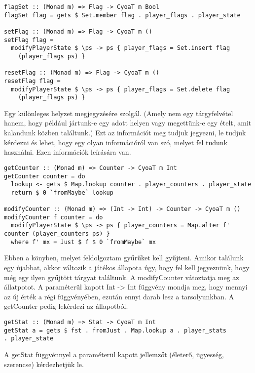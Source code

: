 \documentclass[12pt,a4paper,oneside]{report}
\begin{document}
    \begin{verbatim}
flagSet :: (Monad m) => Flag -> CyoaT m Bool
flagSet flag = gets $ Set.member flag . player_flags . player_state

setFlag :: (Monad m) => Flag -> CyoaT m ()
setFlag flag =
  modifyPlayerState $ \ps -> ps { player_flags = Set.insert flag
    (player_flags ps) }

resetFlag :: (Monad m) => Flag -> CyoaT m ()
resetFlag flag =
  modifyPlayerState $ \ps -> ps { player_flags = Set.delete flag
    (player_flags ps) }
    \end{verbatim}
    Egy különleges helyzet megjegyzésére szolgál. (Amely nem egy
    tárgyfelvétel hanem, hogy például jártunk-e egy adott helyen vagy
    megettünk-e egy ételt, amit kalandunk közben találtunk.) Ezt az
    információt meg tudjuk jegyezni, le tudjuk kérdezni és lehet, hogy
    egy olyan információról van szó, melyet fel tudunk használni. Ezen
    információk leírására van.

    \begin{verbatim}
getCounter :: (Monad m) => Counter -> CyoaT m Int
getCounter counter = do
  lookup <- gets $ Map.lookup counter . player_counters . player_state
  return $ 0 `fromMaybe` lookup

modifyCounter :: (Monad m) => (Int -> Int) -> Counter -> CyoaT m ()
modifyCounter f counter = do
  modifyPlayerState $ \ps -> ps { player_counters = Map.alter f' counter (player_counters ps) }
  where f' mx = Just $ f $ 0 `fromMaybe` mx
    \end{verbatim}
    Ebben a könyben, melyet feldolgoztam gyűrűket kell
    gyűjteni. Amikor találunk egy újabbat, akkor változik a játékos
    állapota úgy, hogy fel kell jegyeznünk, hogy még egy ilyen
    gyűjtött tárgyat találtunk. A modifyCounter vátoztatja meg az
    állatpotot. A paraméterül kapott Int -> Int függvény mondja meg,
    hogy mennyi az új érték a régi függvényében, ezután ennyi darab
    lesz a tarsolyunkban. A getCounter pedig lekérdezi az állapotból.

    \begin{verbatim}
getStat :: (Monad m) => Stat -> CyoaT m Int
getStat a = gets $ fst . fromJust . Map.lookup a . player_stats
. player_state
    \end{verbatim}
    A getStat függvénnyel a paraméterül kapott jellemzőt (életerő,
    ügyesség, szerencse) kérdezhetjük le.
\end{document}

